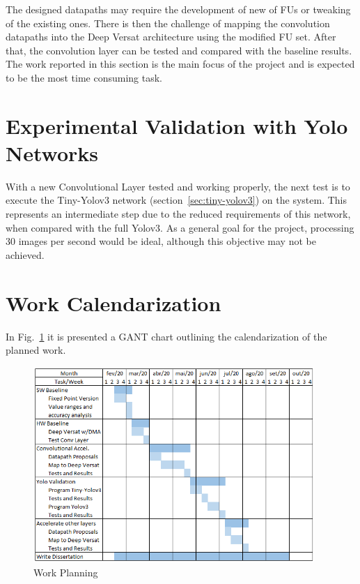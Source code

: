 The designed datapaths may require the development of new of FUs or tweaking of
the existing ones. There is then the challenge of mapping the convolution
datapaths into the Deep Versat architecture using the modified FU set.  After
that, the convolution layer can be tested and compared with the baseline
results. The work reported in this section is the main focus of the project and
is expected to be the most time consuming task.

\section{Experimental Validation with Yolo Networks}
\label{sec:experimental_yolo_validation}
With a new Convolutional Layer tested and working properly, the next test is to
execute the Tiny-Yolov3 network (section~\ref{sec:tiny-yolov3}) on the
system. This represents an intermediate step due to the reduced requirements of
this network, when compared with the full Yolov3. As a general goal for the
project, processing 30 images per second would be ideal, although this objective
may not be achieved.




\section{Work Calendarization}
\label{sec:tasks_GANT}
In Fig.~\ref{fig:tasks_callendar} it is presented a GANT chart outlining the
calendarization of the planned work.



\begin{figure}[!htb]
	\centering
	\includegraphics[width=0.95\textwidth]{Figures/dummy_GANT.png}
	\caption[Caption for figure in TOC.]{Work Planning}
	\label{fig:tasks_callendar}
\end{figure}


